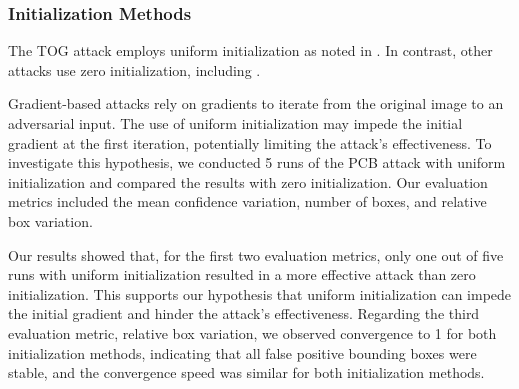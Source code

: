 


\subsubsection{Initialization Methods}

The TOG attack employs uniform initialization as noted in \citep{chow2020adversarial}. In contrast, other attacks use zero initialization, including \citep{fischer2017adversarial,li2021universal,mohamad2021,madry2017towards}. 

Gradient-based attacks rely on gradients to iterate from the original image to an adversarial input. The use of uniform initialization may impede the initial gradient at the first iteration, potentially limiting the attack's effectiveness. To investigate this hypothesis, we conducted 5 runs of the PCB attack with uniform initialization and compared the results with zero initialization. Our evaluation metrics included the mean confidence variation, number of boxes, and relative box variation.

Our results showed that, for the first two evaluation metrics, only one out of five runs with uniform initialization resulted in a more effective attack than zero initialization. This supports our hypothesis that uniform initialization can impede the initial gradient and hinder the attack's effectiveness. Regarding the third evaluation metric, relative box variation, we observed convergence to 1 for both initialization methods, indicating that all false positive bounding boxes were stable, and the convergence speed was similar for both initialization methods.



